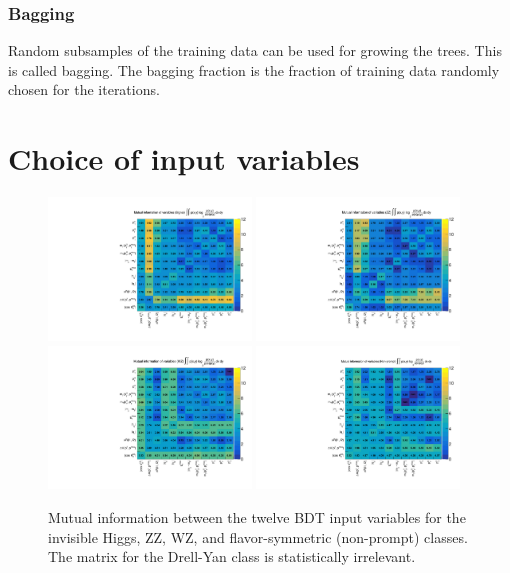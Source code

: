 \subsubsection{Bagging}
Random subsamples of the training data can be used for growing the trees. This is called bagging.
The bagging fraction is the fraction of training data randomly chosen for the iterations.

\section{Choice of input variables}

\begin{figure}[htbp]
\begin{center}
\includegraphics[width=0.48\textwidth]{figures/mutual_information_MVAvars_Signal.pdf}
\includegraphics[width=0.48\textwidth]{figures/mutual_information_MVAvars_ZZ.pdf}
\includegraphics[width=0.48\textwidth]{figures/mutual_information_MVAvars_WZ.pdf}
\includegraphics[width=0.48\textwidth]{figures/mutual_information_MVAvars_Non-prompt.pdf}
\caption{Mutual information between the twelve BDT input variables for the invisible Higgs, ZZ, WZ, and flavor-symmetric (non-prompt) classes. The matrix for the Drell-Yan class is statistically irrelevant.}
\label{fig:bdt_mutual_information}
\end{center}
\end{figure}

